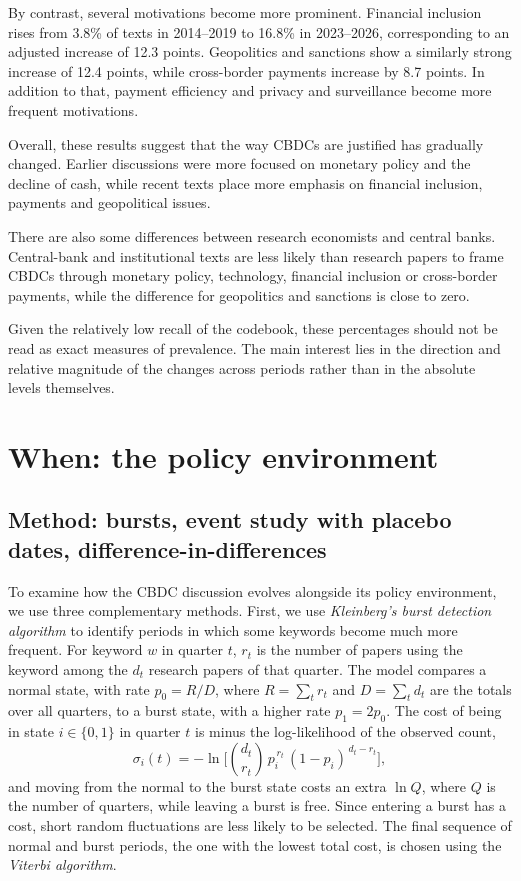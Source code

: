 \documentclass[11pt,a4paper]{article}
\begin{document}
By contrast, several motivations become more prominent. Financial inclusion rises from 3.8\% of texts in 2014–2019 to 16.8\% 
in 2023–2026, corresponding to an adjusted increase of 12.3 points.  Geopolitics and sanctions show a similarly strong increase 
of 12.4 points, while cross-border payments increase by 8.7 points. In addition to that, payment efficiency and privacy and surveillance 
become more frequent motivations. 

Overall, these results suggest that the way CBDCs are justified has gradually changed. Earlier discussions were more focused on monetary 
policy and the decline of cash, while recent texts place more emphasis on financial inclusion, payments and geopolitical issues.

There are also some differences between research economists and central banks. Central-bank and institutional texts are less likely 
than research papers to frame CBDCs through monetary policy, technology, financial inclusion or cross-border payments, while the difference 
for geopolitics and sanctions is close to zero.

Given the relatively low recall of the codebook, these percentages should not be read as exact measures of prevalence. The main interest 
lies in the direction and relative magnitude of the changes across periods rather than in the absolute levels themselves.

\section{When: the policy environment}\label{sec:when}
\subsection{Method: bursts, event study with placebo dates, difference-in-differences}
To examine how the CBDC discussion evolves alongside its policy environment, we use three complementary methods.
First, we use \textit{Kleinberg's burst detection algorithm} to identify periods in which some keywords become much more frequent. 
For keyword \(w\) in quarter \(t\), \(r_t\) is the number of papers using the keyword among the \(d_t\) research papers of that quarter. The model compares a normal 
state, with rate \(p_0 = R/D\), where \(R = \sum_t r_t\) and \(D = \sum_t d_t\) are the totals over all quarters, to a burst state, with a higher rate \(p_1 = 2p_0\). 
The cost of being in state \(i \in \{0, 1\}\) in quarter \(t\) is minus the log-likelihood of the observed count,
\begin{equation}\label{eq:burst}
\sigma_i(t) = -\ln\Big[\binom{d_t}{r_t}\, p_i^{\,r_t}\,(1 - p_i)^{\,d_t - r_t}\Big],
\end{equation}
and moving from the normal to the burst state costs an extra \(\ln Q\), where \(Q\) is the number of quarters, while leaving a burst is free. Since entering a burst has a cost, short random 
fluctuations are less likely to be selected. The final sequence of normal and burst periods, the one with the lowest total cost, is chosen using the \textit{Viterbi algorithm}.
\end{document}
